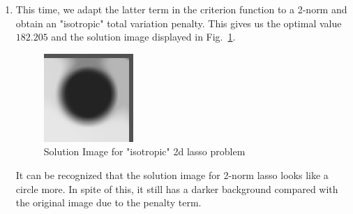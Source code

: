 \documentclass[12pt,letterpaper]{article}
\begin{document}
\begin{enumerate}[(a)]
\begin{enumerate}[1.]
			\item This time, we adapt the latter term in the criterion function to a 2-norm and obtain an "isotropic" total variation penalty. This gives us the optimal value $182.205$ and the solution image displayed in Fig.~\ref{fig:4a2}.
			\begin{figure}[htbp]
				\centering
				\includegraphics{fig/fit2.png}
				\caption{Solution Image for "isotropic" 2d lasso problem}
				\label{fig:4a2}
			\end{figure}
		
			It can be recognized that the solution image for 2-norm lasso looks like a circle more. In spite of this, it still has a darker background compared with the original image due to the penalty term.
		

\end{enumerate}
\end{enumerate}
\end{document}
